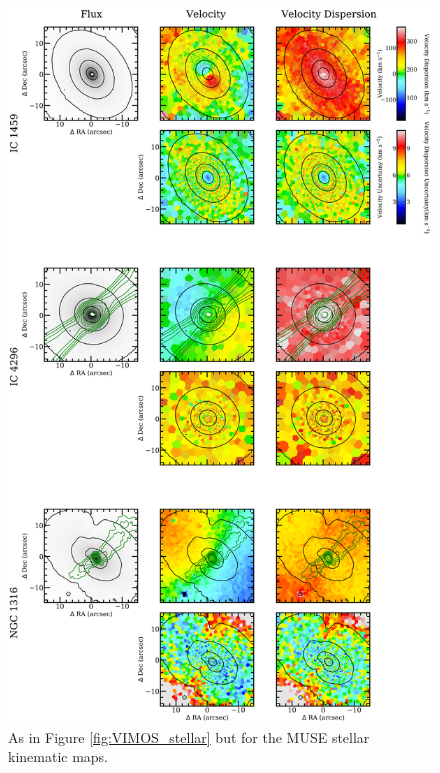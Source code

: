 		\begin{figure}
			\centering
			\includegraphics[height=0.94\textheight]{chapter4/muse/kin1.png}
			\caption[MUSE stellar kinematic maps]{As in Figure \ref{fig:VIMOS_stellar} but for the MUSE stellar kinematic maps.}%
			\label{fig:MUSE_stellar}
		\end{figure}
